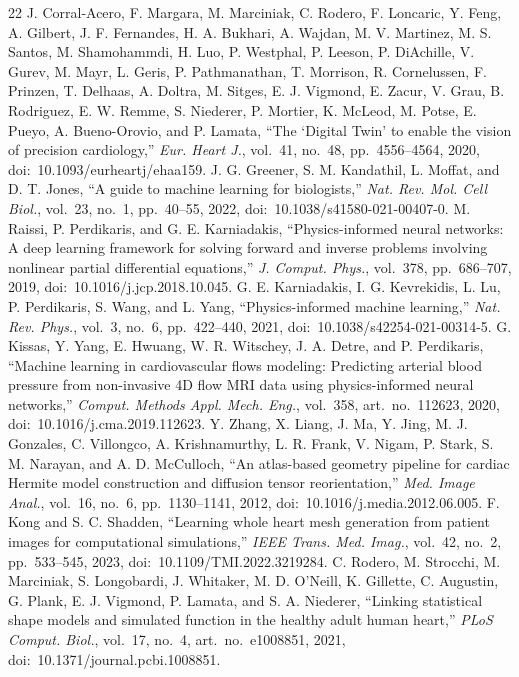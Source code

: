 \documentclass[journal]{IEEEtran}
\begin{document}
\begin{thebibliography}{22}
 J. Corral-Acero, F. Margara, M. Marciniak, C. Rodero, F. Loncaric, Y. Feng, A. Gilbert, J. F. Fernandes, H. A. Bukhari, A. Wajdan, M. V. Martinez, M. S. Santos, M. Shamohammdi, H. Luo, P. Westphal, P. Leeson, P. DiAchille, V. Gurev, M. Mayr, L. Geris, P. Pathmanathan, T. Morrison, R. Cornelussen, F. Prinzen, T. Delhaas, A. Doltra, M. Sitges, E. J. Vigmond, E. Zacur, V. Grau, B. Rodriguez, E. W. Remme, S. Niederer, P. Mortier, K. McLeod, M. Potse, E. Pueyo, A. Bueno-Orovio, and P. Lamata, ``The `Digital Twin' to enable the vision of precision cardiology,'' \emph{Eur. Heart J.}, vol.~41, no.~48, pp.~4556--4564, 2020, doi:~10.1093/eurheartj/ehaa159.
 J. G. Greener, S. M. Kandathil, L. Moffat, and D. T. Jones, ``A guide to machine learning for biologists,'' \emph{Nat. Rev. Mol. Cell Biol.}, vol.~23, no.~1, pp.~40--55, 2022, doi:~10.1038/s41580-021-00407-0.
 M. Raissi, P. Perdikaris, and G. E. Karniadakis, ``Physics-informed neural networks: A deep learning framework for solving forward and inverse problems involving nonlinear partial differential equations,'' \emph{J. Comput. Phys.}, vol.~378, pp.~686--707, 2019, doi:~10.1016/j.jcp.2018.10.045.
 G. E. Karniadakis, I. G. Kevrekidis, L. Lu, P. Perdikaris, S. Wang, and L. Yang, ``Physics-informed machine learning,'' \emph{Nat. Rev. Phys.}, vol.~3, no.~6, pp.~422--440, 2021, doi:~10.1038/s42254-021-00314-5.
 G. Kissas, Y. Yang, E. Hwuang, W. R. Witschey, J. A. Detre, and P. Perdikaris, ``Machine learning in cardiovascular flows modeling: Predicting arterial blood pressure from non-invasive 4D flow MRI data using physics-informed neural networks,'' \emph{Comput. Methods Appl. Mech. Eng.}, vol.~358, art.~no.~112623, 2020, doi:~10.1016/j.cma.2019.112623.
 Y. Zhang, X. Liang, J. Ma, Y. Jing, M. J. Gonzales, C. Villongco, A. Krishnamurthy, L. R. Frank, V. Nigam, P. Stark, S. M. Narayan, and A. D. McCulloch, ``An atlas-based geometry pipeline for cardiac Hermite model construction and diffusion tensor reorientation,'' \emph{Med. Image Anal.}, vol.~16, no.~6, pp.~1130--1141, 2012, doi:~10.1016/j.media.2012.06.005.
 F. Kong and S. C. Shadden, ``Learning whole heart mesh generation from patient images for computational simulations,'' \emph{IEEE Trans. Med. Imag.}, vol.~42, no.~2, pp.~533--545, 2023, doi:~10.1109/TMI.2022.3219284.
 C. Rodero, M. Strocchi, M. Marciniak, S. Longobardi, J. Whitaker, M. D. O'Neill, K. Gillette, C. Augustin, G. Plank, E. J. Vigmond, P. Lamata, and S. A. Niederer, ``Linking statistical shape models and simulated function in the healthy adult human heart,'' \emph{PLoS Comput. Biol.}, vol.~17, no.~4, art.~no.~e1008851, 2021, doi:~10.1371/journal.pcbi.1008851.

\end{thebibliography}
\end{document}
